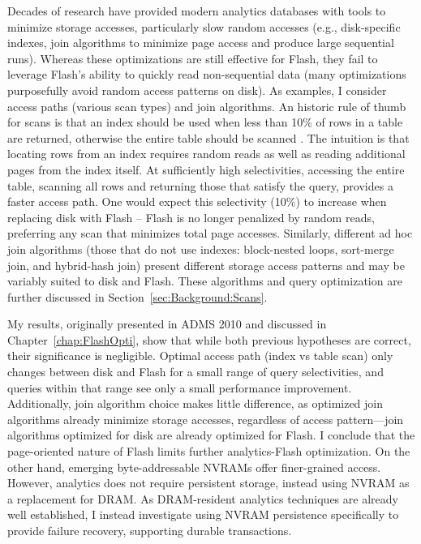 Decades of research have provided modern analytics databases with tools to minimize storage accesses, particularly slow random accesses (e.g., disk-specific indexes, join algorithms to minimize page access and produce large sequential runs).
Whereas these optimizations are still effective for Flash, they fail to leverage Flash's ability to quickly read non-sequential data (many optimizations purposefully avoid random access patterns on disk).
As examples, I consider access paths (various scan types) and join algorithms.
An historic rule of thumb for scans is that an index should be used when less than 10\% of rows in a table are returned, otherwise the entire table should be scanned \cite{RamakrishnanAndGehrke}.
The intuition is that locating rows from an index requires random reads as well as reading additional pages from the index itself.
At sufficiently high selectivities, accessing the entire table, scanning all rows and returning those that satisfy the query, provides a faster access path.
One would expect this selectivity (10\%) to increase when replacing disk with Flash -- Flash is no longer penalized by random reads, preferring any scan that minimizes total page accesses.
Similarly, different ad hoc join algorithms (those that do not use indexes: block-nested loops, sort-merge join, and hybrid-hash join) present different storage access patterns and may be variably suited to disk and Flash.
These algorithms and query optimization are further discussed in Section~\ref{sec:Background:Scans}.

My results, originally presented in ADMS 2010 \cite{PelleyWenisch11} and discussed in Chapter~\ref{chap:FlashOpti}, show that while both previous hypotheses are correct, their significance is negligible.
Optimal access path (index vs table scan) only changes between disk and Flash for a small range of query selectivities, and queries within that range see only a small performance improvement.
Additionally, join algorithm choice makes little difference, as optimized join algorithms already minimize storage accesses, regardless of access pattern---join algorithms optimized for disk are already optimized for Flash.
I conclude that the page-oriented nature of Flash limits further analytics-Flash optimization.
On the other hand, emerging byte-addressable NVRAMs offer finer-grained access.
However, analytics does not require persistent storage, instead using NVRAM as a replacement for DRAM.
As DRAM-resident analytics techniques are already well established, I instead investigate using NVRAM persistence specifically to provide failure recovery, supporting durable transactions.

